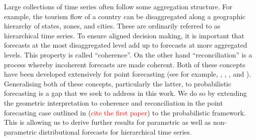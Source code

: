 \documentclass[12pt]{article}
\theoremstyle{definition}
\begin{document}
Large collections of time series often follow some aggregation structure. For example, the tourism flow of a country can be disaggregated along a geographic hierarchy of states, zones, and cities. These are ordinarily referred to as hierarchical time series. To ensure aligned decision making, it is important that forecasts at the most disaggregated level add up to forecasts at more aggregated levels. This property is called ``coherence''.  On the other hand ``reconciliation'' is a process whereby incoherent forecasts are made coherent. Both of these concepts have been developed extensively for point forecasting (see for example, \citet{Dunn1976}, \citet{Gross1990}, \citet{AthEtAl2009}, \citet{Hyndman2011} and \citet{WicEtAl2019}). Generalising both of these concepts, particularly the latter, to probabilistic forecasting is a gap that we seek to address in this work.  We do so by extending the geometric interpretation to coherence and reconciliation in the point forecasting case outlined in (\textcolor{red}{cite the first paper}) to the probabilistic framework. This is allowing us to derive further results for parametric as well as non-parametric distributional forecasts for hierarchical time series.

%
\end{document}
